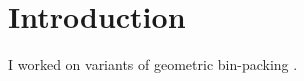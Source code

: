 \chapter{Introduction}
\label{chap:intro}

I worked on variants of geometric bin-packing
\cite{aco-gvbp,eku-hdhk,eku-pst,eku-harmonic}.
